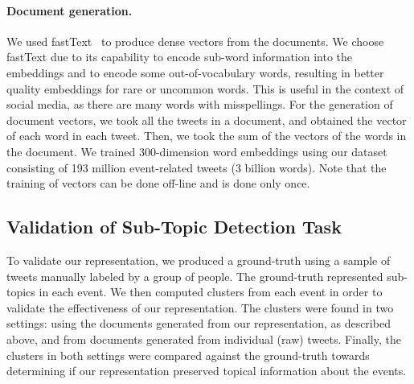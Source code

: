 
\paragraph{Document generation.}
%
We used fastText~\cite{bojanowski2017enriching} to produce dense vectors from
the documents.
%
We choose fastText due to its capability to encode sub-word information into the
embeddings and to encode some out-of-vocabulary words, resulting in better
quality embeddings for rare or uncommon words. 
%
This is useful in the context of social media, as there are many words with
misspellings. 
%
For the generation of document vectors, we took all the tweets in a document,
and obtained the vector of each word in each tweet.
%
Then, we took the sum of the vectors of the words in the document.
%
We trained 300-dimension word embeddings using our dataset consisting of 193
million event-related tweets (3 billion words).
%
Note that the training of vectors can be done off-line and is done only once.


\subsection{Validation of Sub-Topic Detection Task}

To validate our representation, we produced a ground-truth using a sample of
tweets manually labeled by a group of people.
%
The ground-truth represented sub-topics in each event. 
%
We then computed clusters from each event in order to validate the effectiveness
of our representation.
%
The clusters were found in two settings: using the documents generated from our
representation, as described above, and from documents generated from individual
(raw) tweets.
%
Finally, the clusters in both settings were compared against the ground-truth
towards determining if our representation preserved topical information about
the events.


